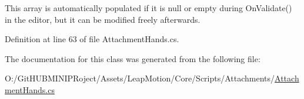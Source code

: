 This array is automatically populated if it is null or empty during On\+Validate() in the editor, but it can be modified freely afterwards. 

Definition at line 63 of file Attachment\+Hands.\+cs.



The documentation for this class was generated from the following file\+:\begin{DoxyCompactItemize}
\item 
O\+:/\+Git\+H\+U\+B\+M\+I\+N\+I\+P\+Roject/\+Assets/\+Leap\+Motion/\+Core/\+Scripts/\+Attachments/\mbox{\hyperlink{_attachment_hands_8cs}{Attachment\+Hands.\+cs}}\end{DoxyCompactItemize}

